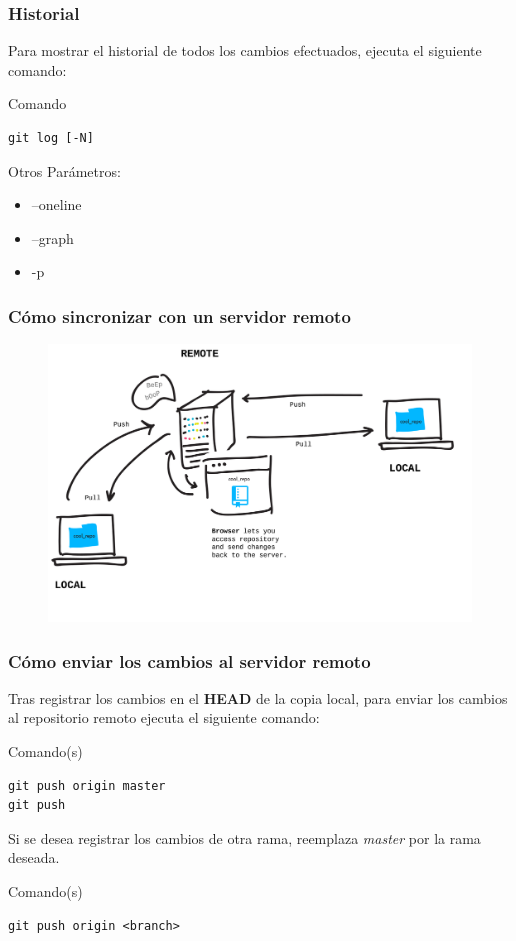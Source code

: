 \documentclass{beamer}
\begin{document}
\begin{frame}[fragile]
\frametitle{Historial}
Para mostrar el historial de todos los cambios efectuados, ejecuta el siguiente comando:
\begin{block}{Comando}
\begin{verbatim}
git log [-N]
\end{verbatim}
\end{block}
\vskip 0.50cm
Otros Parámetros:
\begin{itemize}
\item --oneline
\item --graph
\item -p
\end{itemize}
\end{frame}

\begin{frame}
\frametitle{Cómo sincronizar con un servidor remoto}
\begin{figure}
\includegraphics[width=0.95\linewidth]{img/remote.png}
\end{figure}
\end{frame}

\begin{frame}[fragile]
\frametitle{Cómo enviar los cambios al servidor remoto}
Tras registrar los cambios en el \textbf{HEAD} de la copia local, para enviar los cambios al repositorio remoto ejecuta el siguiente comando:
\begin{block}{Comando(s)}
\begin{verbatim}
git push origin master
git push
\end{verbatim}
\end{block}
\vskip 1.00cm
Si se desea registrar los cambios de otra rama, reemplaza \textit{master} por la rama deseada.
\begin{block}{Comando(s)}
\begin{verbatim}
git push origin <branch>
\end{verbatim}
\end{block}
\end{frame}
\end{document}
